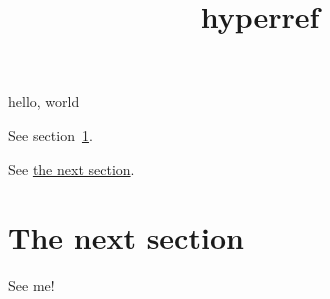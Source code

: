 \documentclass{amsart}
\title{hyperref}
\begin{document}
hello, world

See section~\ref{ref:sec}.

See \hyperref[ref:sec]{the next section}.

\newpage

\section{The next section}
\label{ref:sec}

See me!
\end{document}
